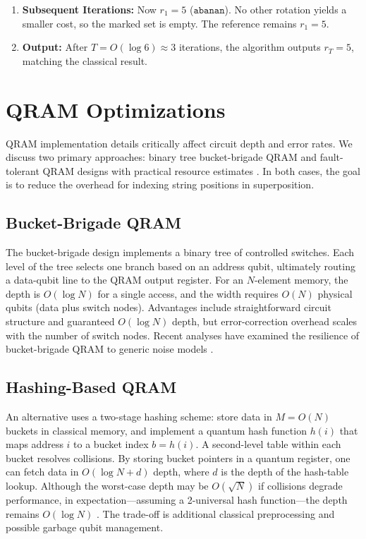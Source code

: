 \documentclass[11pt,letterpaper]{article}
\begin{document}
\begin{enumerate}
\begin{itemize}
    \end{itemize}
    \item \textbf{Subsequent Iterations:} Now \(r_{1}=5\) (\(\texttt{abanan}\)). No other rotation yields a smaller cost, so the marked set is empty. The reference remains \(r_{1}=5\).
    \item \textbf{Output:} After \(T = O(\log 6)\approx 3\) iterations, the algorithm outputs \(r_{T}=5\), matching the classical result.
\end{enumerate}


\section{QRAM Optimizations}
\label{sec:qram}
QRAM implementation details critically affect circuit depth and error rates. We discuss two primary approaches: binary tree bucket-brigade QRAM \cite{giovannetti2008architectures} and fault-tolerant QRAM designs with practical resource estimates \cite{dimatteo2020fault}. In both cases, the goal is to reduce the overhead for indexing string positions in superposition.

\subsection{Bucket-Brigade QRAM}
The bucket-brigade design implements a binary tree of controlled switches. Each level of the tree selects one branch based on an address qubit, ultimately routing a data-qubit line to the QRAM output register. For an \(N\)-element memory, the depth is \(O(\log N)\) for a single access, and the width requires \(O(N)\) physical qubits (data plus switch nodes). Advantages include straightforward circuit structure and guaranteed \(O(\log N)\) depth, but error-correction overhead scales with the number of switch nodes. Recent analyses have examined the resilience of bucket-brigade QRAM to generic noise models \cite{hann2021resilience}.

\subsection{Hashing-Based QRAM}
An alternative uses a two-stage hashing scheme: store data in \(M = O(N)\) buckets in classical memory, and implement a quantum hash function \(h(i)\) that maps address \(i\) to a bucket index \(b = h(i)\). A second-level table within each bucket resolves collisions. By storing bucket pointers in a quantum register, one can fetch data in \(O(\log N + d)\) depth, where \(d\) is the depth of the hash-table lookup. Although the worst-case depth may be \(O(\sqrt{N})\) if collisions degrade performance, in expectation---assuming a 2-universal hash function---the depth remains \(O(\log N)\) \cite{dimatteo2020fault}. The trade-off is additional classical preprocessing and possible garbage qubit management.
\end{document}
